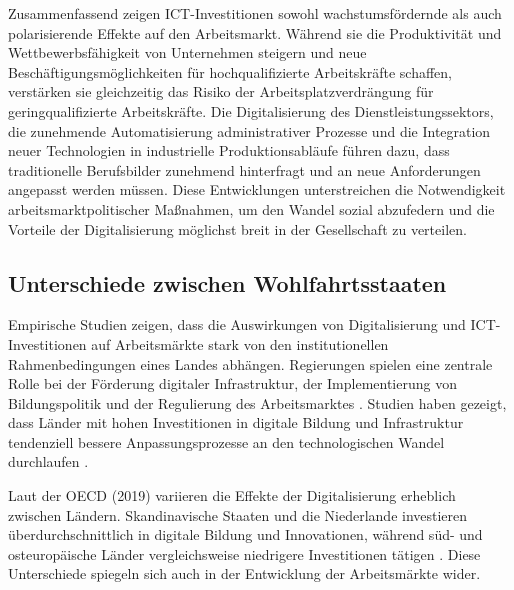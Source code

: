 Zusammenfassend zeigen \ac{ICT}-Investitionen sowohl wachstumsfördernde als auch 
polarisierende Effekte auf den Arbeitsmarkt. Während sie die Produktivität und 
Wettbewerbsfähigkeit von Unternehmen steigern und neue Beschäftigungsmöglichkeiten für 
hochqualifizierte Arbeitskräfte schaffen, verstärken sie gleichzeitig das Risiko der 
Arbeitsplatzverdrängung für geringqualifizierte Arbeitskräfte. Die Digitalisierung des 
Dienstleistungssektors, die zunehmende Automatisierung administrativer Prozesse und die 
Integration neuer Technologien in industrielle Produktionsabläufe führen dazu, dass 
traditionelle Berufsbilder zunehmend hinterfragt und an neue Anforderungen angepasst 
werden müssen. Diese Entwicklungen unterstreichen die Notwendigkeit 
arbeitsmarktpolitischer Maßnahmen, um den Wandel sozial abzufedern und die Vorteile der 
Digitalisierung möglichst breit in der Gesellschaft zu verteilen.


\subsection{Unterschiede zwischen Wohlfahrtsstaaten}

Empirische Studien zeigen, dass die Auswirkungen von Digitalisierung und 
\ac{ICT}-Investitionen auf Arbeitsmärkte stark von den institutionellen Rahmenbedingungen 
eines Landes abhängen. Regierungen spielen eine zentrale Rolle bei der Förderung 
digitaler Infrastruktur, der Implementierung von Bildungspolitik und der Regulierung des 
Arbeitsmarktes \parencite[vgl.][S. 4–5]{hall2001varieties}. Studien haben gezeigt, dass 
Länder mit hohen Investitionen in digitale Bildung und Infrastruktur tendenziell bessere 
Anpassungsprozesse an den technologischen Wandel durchlaufen 
\parencite[vgl.][S. 22–23]{oecd2020digital}.

Laut der \ac{OECD} (2019) variieren die Effekte der Digitalisierung erheblich zwischen 
Ländern. Skandinavische Staaten und die Niederlande investieren überdurchschnittlich in 
digitale Bildung und Innovationen, während süd- und osteuropäische Länder vergleichsweise 
niedrigere Investitionen tätigen \parencite[vgl.][S. 24]{oecd2020digital}. Diese 
Unterschiede spiegeln sich auch in der Entwicklung der Arbeitsmärkte wider.


